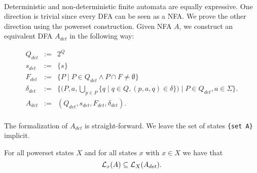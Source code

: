 \paragraph{} 
Deterministic and non-deterministic finite automata are equally expressive. 
One direction is trivial since every DFA can be seen as a NFA. 
We prove the other direction using the powerset construction. 
Given NFA $A$, we construct an equivalent DFA $A_{det}$ in the following way:

\begin{eqnarray*}
    Q_{det} & := & 2^Q \\ %
    {s}_{det} & := & \{ s \} \\
    F_{det} & := & \{ P \; | \; P \in Q_{det} \wedge P \cap F \neq \emptyset \} \\
    \delta_{det} & := & \{ (P,a,\bigcup \limits _{p \in P} \{ q \; | \; q \in Q, (p,a,q) \in \delta \}) \; | \; P \in Q_{det}, a \in \Sigma \}.     \\
    A_{det} &:=&  (Q_{det}, s_{det}, F_{det}, \delta_{det}).
\end{eqnarray*}

\paragraph{}
The formalization of $A_{det}$ is straight-forward. 
We leave the set of states \lstinline!{set A}! implicit.


\begin{lemma}
    \label{nfa_to_dfa_complete}
    For all powerset states $X$ and for all states $x$ with $x \in X$ we have that
    \begin{equation*}
        \mathcal{L}_{x}(A) \subseteq \mathcal{L}_{X}(A_{det}).
    \end{equation*}
\end{lemma}

